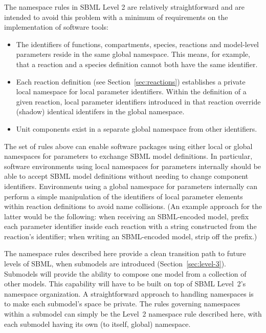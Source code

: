 \documentclass[10pt,twocolumntoc]{cekarticle}
\begin{document}
The namespace rules in SBML Level 2 are relatively straightforward
and are intended to avoid this problem with a minimum of
requirements on the implementation of software tools:
\begin{itemize}
  
\item The identifiers of functions, compartments, species, reactions and
  model-level parameters reside in the same global namespace. This means,
  for example, that a reaction and a species definition cannot both have
  the same identifier.

\item Each reaction definition (see Section~\ref{sec:reactions})
  establishes a private local namespace for local parameter identifiers. Within the
  definition of a given reaction, local parameter identifiers introduced in that
  reaction override (shadow) identical identifers in the global namespace.

\item Unit components exist in a separate global namespace from
other identifiers.

\end{itemize}

The set of rules above can enable software packages using either
local or global namespaces for parameters to exchange SBML model definitions. In particular, software environments using local namespaces for parameters
internally should be able to accept SBML model definitions without
needing to change component identifiers. Environments using a
global namespace for parameters internally can perform a simple manipulation of the identifiers of local parameter elements within reaction definitions to avoid name collisions.  (An example approach for the latter would be the
following: when receiving an SBML-encoded model, prefix each
parameter identifier inside each reaction with a string constructed from the
reaction's identifier; when writing an SBML-encoded model, strip
off the prefix.)

The namespace rules described here provide a clean transition path
to future levels of SBML, when submodels are introduced
(Section~\ref{sec:level-3}).  Submodels will provide the ability
to compose one model from a collection of other models.  This
capability will have to be built on top of SBML Level~2's
namespace organization.  A straightforward approach to handling
namespaces is to make each submodel's space be private.  The rules
governing namespaces within a submodel can simply be the Level~2
namespace rule described here, with each submodel having its own
(to itself, global) namespace.
\end{document}
